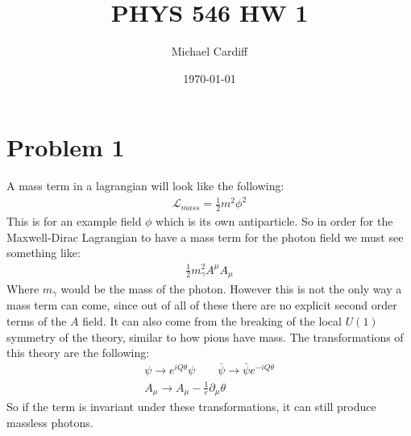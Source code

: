 \documentclass[12pt]{article}
\title{\vspace{-3em}PHYS 546 HW 1}
\author{Michael Cardiff}
\date{\today}
\renewcommand{\L}{\mathcal{L}}
\newcommand{\D}{\partial}
\begin{document}
\maketitle

\section*{Problem 1}
A mass term in a lagrangian will look like the following:
\begin{align*}
  \L_{mass}=\frac{1}{2}m^2\phi^2
\end{align*}
This is for an example field $\phi$ which is its own antiparticle. So in order for the Maxwell-Dirac Lagrangian to have a mass term for the photon field we must see something like:
\begin{align*}
  \frac{1}{2}m_\gamma^2A^\mu A_\mu
\end{align*}
Where $m_\gamma$ would be the mass of the photon. However this is not the only way a mass term can come, since out of all of these there are no explicit second order terms of the $A$ field. It can also come from the breaking of the local $U(1)$ symmetry of the theory, similar to how pions have mass. The transformations of this theory are the following:
\begin{gather*}
  \psi\to e^{iQ\theta}\psi\qquad\bar{\psi}\to \bar{\psi}e^{-iQ\theta}\\
  A_\mu\to A_\mu-\frac{1}{e}\D_\mu\theta
\end{gather*}
So if the term is invariant under these transformations, it can still produce massless photons.
\end{document}
